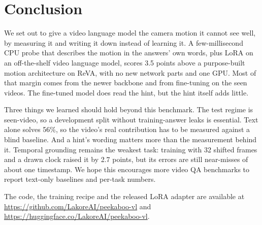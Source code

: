 \section{Conclusion}
We set out to give a video language model the camera motion it cannot see
well, by measuring it and writing it down instead of learning it. A
few-millisecond CPU probe that describes the motion in the answers' own
words, plus LoRA on an off-the-shelf video language model, scores 3.5
points above a purpose-built motion architecture on ReVA, with no new
network parts and one GPU. Most of that margin comes from the newer
backbone and from fine-tuning on the seen videos. The fine-tuned model
does read the hint, but the hint itself adds little.

Three things we learned should hold beyond this benchmark. The test regime
is seen-video, so a development split without training-answer leaks is
essential. Text alone solves 56\%, so the video's real contribution has to
be measured against a blind baseline. And a hint's wording matters more
than the measurement behind it. Temporal grounding remains the weakest
task: training with 32 shifted frames and a drawn clock raised it by 2.7
points, but its errors are still near-misses of about one timestamp. We
hope this encourages more video QA benchmarks to report text-only
baselines and per-task numbers.

The code, the training recipe and the released LoRA adapter are available
at \url{https://github.com/LakoreAI/peekaboo-vl} and
\url{https://huggingface.co/LakoreAI/peekaboo-vl}.
